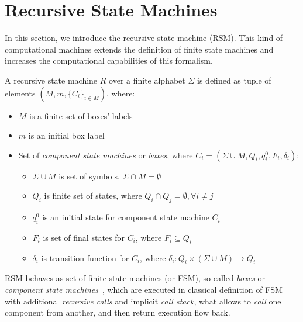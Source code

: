 \section{Recursive State Machines}

In this section, we introduce the recursive state machine (RSM). This kind of computational machines extends the definition of finite state machines and increases the computational capabilities of this formalism.

A recursive state machine $R$ over a finite alphabet $\Sigma$ is defined as tuple of elements $(M,m,\{C_i\}_{i \in M})$, where:

\begin{itemize}
    \item $M$ is a finite set of boxes' labels
    \item $m$ is an initial box label
    \item Set of \textit{component state machines} or \textit{boxes}, 
          where $C_i=(\Sigma \cup M, Q_i,q_i^0,F_i,\delta_i)$:
    \begin{itemize}
        \item $\Sigma \cup M$ is set of symbols, $\Sigma \cap M = \emptyset$
        \item $Q_i$ is finite set of states, 
              where $Q_i \cap Q_j = \emptyset, \forall i \neq j$
        \item $q_i^0$ is an initial state for component state machine $C_i$
        \item $F_i$ is set of final states for $C_i$, where $F_i \subseteq Q_i$
        \item $\delta_i$ is transition function for $C_i$, 
              where $\delta_i: Q_i \times (\Sigma \cup M) 
              \to Q_i$
    \end{itemize}
\end{itemize}

RSM behaves as set of finite state machines (or FSM), so called \textit{boxes} or \textit{component state machines}~\cite{rsm:analysis:10.1007/3-540-44585-4_18}, which are executed in classical definition of  FSM with additional \textit{recursive calls} and implicit \textit{call stack}, what allows to \textit{call} one component from another, and then return execution flow back.



